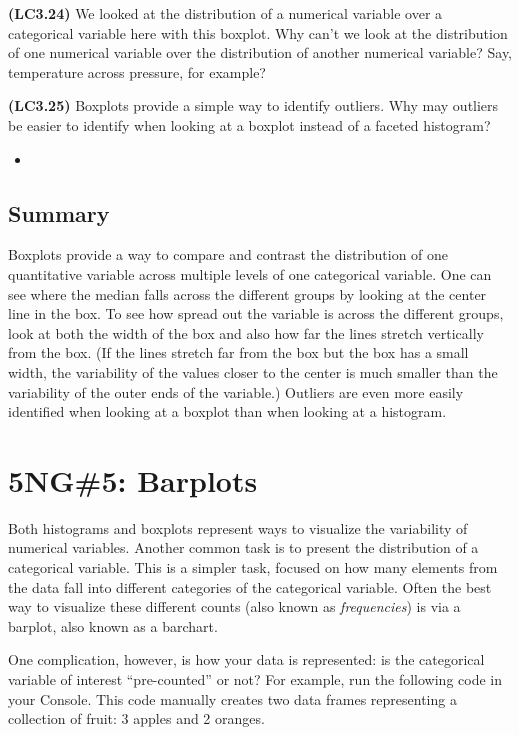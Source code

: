 \documentclass[12pt,]{krantz}
\newenvironment{rmdblock}[1]
  {\begin{shaded*}
  \begin{itemize}
  \renewcommand{\labelitemi}{
    \raisebox{-.7\height}[0pt][0pt]{
    }
  }
  \item
  }
  {
  \end{itemize}
  \end{shaded*}
  }
\newenvironment{learncheck}
  {\begin{rmdblock}{warning}}
  {\end{rmdblock}}
\begin{document}
\textbf{(LC3.24)} We looked at the distribution of a numerical variable
over a categorical variable here with this boxplot. Why can't we look at
the distribution of one numerical variable over the distribution of
another numerical variable? Say, temperature across pressure, for
example?

\textbf{(LC3.25)} Boxplots provide a simple way to identify outliers.
Why may outliers be easier to identify when looking at a boxplot instead
of a faceted histogram?

\begin{learncheck}

\end{learncheck}

\subsection{Summary}\label{summary-3}

Boxplots provide a way to compare and contrast the distribution of one
quantitative variable across multiple levels of one categorical
variable. One can see where the median falls across the different groups
by looking at the center line in the box. To see how spread out the
variable is across the different groups, look at both the width of the
box and also how far the lines stretch vertically from the box. (If the
lines stretch far from the box but the box has a small width, the
variability of the values closer to the center is much smaller than the
variability of the outer ends of the variable.) Outliers are even more
easily identified when looking at a boxplot than when looking at a
histogram.

\section{5NG\#5: Barplots}\label{geombar}

Both histograms and boxplots represent ways to visualize the variability
of numerical variables. Another common task is to present the
distribution of a categorical variable. This is a simpler task, focused
on how many elements from the data fall into different categories of the
categorical variable. Often the best way to visualize these different
counts (also known as \emph{frequencies}) is via a barplot, also known
as a barchart.

One complication, however, is how your data is represented: is the
categorical variable of interest ``pre-counted'' or not? For example,
run the following code in your Console. This code manually creates two
data frames representing a collection of fruit: 3 apples and 2 oranges.
\end{document}
